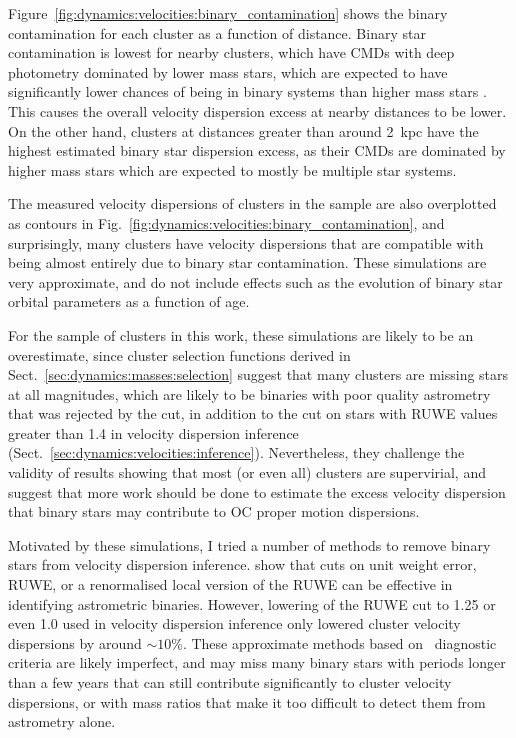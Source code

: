 Figure~\ref{fig:dynamics:velocities:binary_contamination} shows the binary contamination for each cluster as a function of distance. Binary star contamination is lowest for nearby clusters, which have CMDs with deep photometry dominated by lower mass stars, which are expected to have significantly lower chances of being in binary systems than higher mass stars \citep{moe_mind_2017}. This causes the overall velocity dispersion excess at nearby distances to be lower. On the other hand, clusters at distances greater than around 2~kpc have the highest estimated binary star dispersion excess, as their CMDs are dominated by higher mass stars which are expected to mostly be multiple star systems. 

The measured velocity dispersions of clusters in the sample are also overplotted as contours in Fig.~\ref{fig:dynamics:velocities:binary_contamination}, and surprisingly, many clusters have velocity dispersions that are compatible with being almost entirely due to binary star contamination. These simulations are very approximate, and do not include effects such as the evolution of binary star orbital parameters as a function of age.

For the sample of clusters in this work, these simulations are likely to be an overestimate, since cluster selection functions derived in Sect.~\ref{sec:dynamics:masses:selection} suggest that many clusters are missing stars at all magnitudes, which are likely to be binaries with poor quality astrometry that was rejected by the \cite{rybizki_classifier_2022} cut, in addition to the cut on stars with RUWE values greater than 1.4 in velocity dispersion inference (Sect.~\ref{sec:dynamics:velocities:inference}). Nevertheless, they challenge the validity of results showing that most (or even all) clusters are supervirial, and suggest that more work should be done to estimate the excess velocity dispersion that binary stars may contribute to OC proper motion dispersions. 

Motivated by these simulations, I tried a number of methods to remove binary stars from velocity dispersion inference. \cite{penoyre_astrometric_2022,penoyre_astrometric_2022-1} show that cuts on unit weight error, RUWE, or a renormalised local version of the RUWE can be effective in identifying astrometric binaries. However, lowering of the RUWE cut to 1.25 or even 1.0 used in velocity dispersion inference only lowered cluster velocity dispersions by around $\sim10$\%. These approximate methods based on \gaia\ diagnostic criteria are likely imperfect, and may miss many binary stars with periods longer than a few years that can still contribute significantly to cluster velocity dispersions, or with mass ratios that make it too difficult to detect them from astrometry alone.

